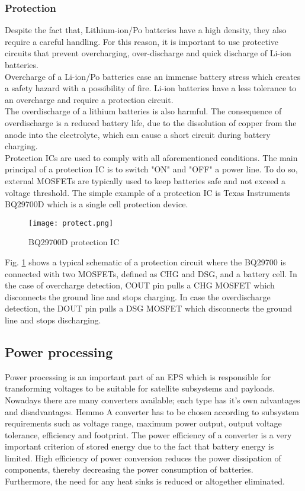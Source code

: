 \subsubsection{Protection}

Despite the fact that, Lithium-ion/Po batteries have a high density, they also require a careful handling. For this reason, it is important to use protective circuits that prevent overcharging, over-discharge and quick discharge of Li-ion batteries.\\
\cite{16} Overcharge of a Li-ion/Po batteries case an immense battery stress which creates a safety hazard with a possibility of fire. Li-ion batteries have a less tolerance to an overcharge and require a protection circuit.\\
The overdischarge of a lithium batteries is also harmful. The consequence of overdischarge is a reduced battery life, due to the dissolution of copper from the anode into the electrolyte, which can cause a short circuit during battery charging.\\
Protection ICs are used to comply with all aforementioned conditions. The main principal of a protection IC is to switch "ON" and "OFF" a power line. To do so, external MOSFETs are typically used to keep batteries safe and not exceed a voltage threshold. The simple example of a protection IC is Texas Instruments BQ29700D which is a single cell protection device. 

\begin{figure}[h]
	\centering
	\texttt{[image: protect.png]}
	\caption{ BQ29700D protection IC \cite{17}}
	\label{fig: EPS1}
\end{figure}

Fig. \ref{fig: EPS1} shows a typical schematic of a protection circuit where the BQ29700 is connected with two MOSFETs, defined as CHG and DSG, and a battery cell. In the case of overcharge detection, COUT pin pulls a CHG MOSFET which disconnects the ground line and stops charging. In case the overdischarge detection, the DOUT pin pulls a DSG MOSFET which disconnects the ground line and stops discharging.

\subsection{Power processing \label{sec:tech}}

Power processing is an important part of an EPS which is responsible for transforming voltages to be suitable for satellite subsystems and payloads. Nowadays there are many converters available; each type has it's own advantages and disadvantages. Hemmo\cite{18} A converter has to be chosen according to subsystem requirements such as voltage range, maximum power output, output voltage tolerance, efficiency and footprint. The power efficiency of a converter is a very important criterion of stored energy due to the fact that battery energy is limited. High efficiency of  power conversion reduces the power dissipation of  components, thereby decreasing the power consumption of batteries. Furthermore, the need for any heat sinks is reduced or altogether eliminated. 

